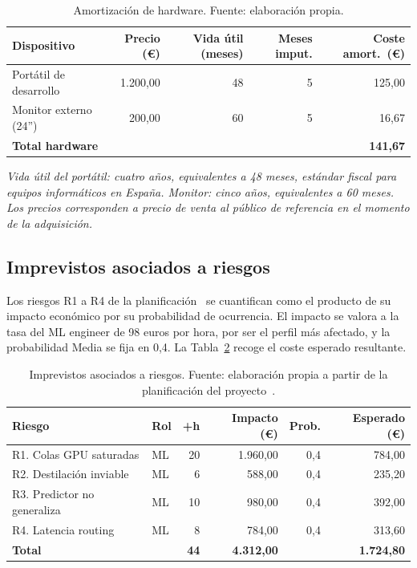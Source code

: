 \begin{table}[H]
\centering
\caption{Amortización de hardware. Fuente: elaboración propia.}
\label{tab:hardware}
\footnotesize
\begin{tabular}{l r r r r}
\toprule
\textbf{Dispositivo} & \textbf{Precio (\euro{})} & \textbf{Vida útil (meses)} & \textbf{Meses imput.} & \textbf{Coste amort.\ (\euro{})} \\
\midrule
Portátil de desarrollo & 1.200,00 & 48 & 5 & 125,00 \\
Monitor externo (24'') & 200,00   & 60 & 5 & 16,67  \\
\midrule
\textbf{Total hardware} & & & & \textbf{141,67} \\
\bottomrule
\end{tabular}
\end{table}

\noindent\textit{\scriptsize Vida útil del portátil: cuatro años, equivalentes a 48 meses, estándar fiscal para equipos informáticos en España. Monitor: cinco años, equivalentes a 60 meses. Los precios corresponden a precio de venta al público de referencia en el momento de la adquisición.}

\subsection{Imprevistos asociados a riesgos}

Los riesgos R1 a R4 de la planificación~\cite{gep23e2} se cuantifican como el producto de su impacto económico por su probabilidad de ocurrencia. El impacto se valora a la tasa del ML engineer de 98 euros por hora, por ser el perfil más afectado, y la probabilidad Media se fija en 0,4. La Tabla~\ref{tab:imprevistos} recoge el coste esperado resultante.

\begin{table}[H]
\centering
\caption{Imprevistos asociados a riesgos. Fuente: elaboración propia a partir de la planificación del proyecto~\cite{gep23e2}.}
\label{tab:imprevistos}
\footnotesize
\begin{tabular}{l l r r r r}
\toprule
\textbf{Riesgo} & \textbf{Rol} & \textbf{+h} & \textbf{Impacto (\euro{})} & \textbf{Prob.} & \textbf{Esperado (\euro{})} \\
\midrule
R1. Colas GPU saturadas     & ML & 20 & 1.960,00 & 0,4 & 784,00  \\
R2. Destilación inviable    & ML & 6  & 588,00   & 0,4 & 235,20  \\
R3. Predictor no generaliza & ML & 10 & 980,00   & 0,4 & 392,00  \\
R4. Latencia routing        & ML & 8  & 784,00   & 0,4 & 313,60  \\
\midrule
\textbf{Total} & & \textbf{44} & \textbf{4.312,00} & & \textbf{1.724,80} \\
\bottomrule
\end{tabular}
\end{table}

